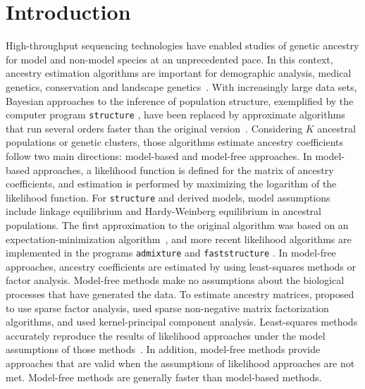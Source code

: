 \section{Introduction}

 High-throughput sequencing technologies have enabled studies of genetic ancestry for model and non-model species at an unprecedented pace. In this  context, ancestry estimation algorithms are important for demographic analysis, medical genetics, conservation and landscape genetics~\citep{Pritchard2000, Tang2005, Schraiber2015, Segelbacher2010, Francois2015}.  With increasingly large data sets, Bayesian approaches to the inference of population structure, exemplified by the computer program {\tt structure} \citep{Pritchard2000}, have been replaced by approximate algorithms that run several orders faster than the original version~\citep{Tang2005, Alexander2011, Frichot2014, Raj2014}.  Considering $K$ ancestral populations or genetic clusters, those algorithms estimate ancestry coefficients follow two main directions: model-based and model-free approaches. In model-based approaches, a likelihood function is defined for the matrix of ancestry coefficients, and estimation is performed by maximizing the logarithm of the likelihood function. For {\tt structure} and derived models, model assumptions include linkage equilibrium and Hardy-Weinberg equilibrium in ancestral populations. The first approximation to the original algorithm was based on an expectation-minimization algorithm~\citep{Tang2005}, and more recent likelihood algorithms are implemented in the programs {\tt admixture}  and {\tt faststructure} \citep{Alexander2011, Raj2014}. In model-free approaches, ancestry coefficients are estimated by using least-squares methods or factor analysis. Model-free methods make no assumptions about the biological processes that have generated the data. To estimate ancestry matrices, \cite{Engelhardt2010} proposed to use sparse factor analysis, \cite{Frichot2014} used sparse non-negative matrix factorization algorithms, and \cite{Popescu2014} used kernel-principal component analysis. Least-squares methods accurately reproduce the results of likelihood approaches under the model assumptions of those methods~\citep{Frichot2014, Popescu2014}.  In addition, model-free methods provide approaches that are valid when the assumptions of likelihood approaches are not met. Model-free methods are generally faster than model-based methods. 
   
